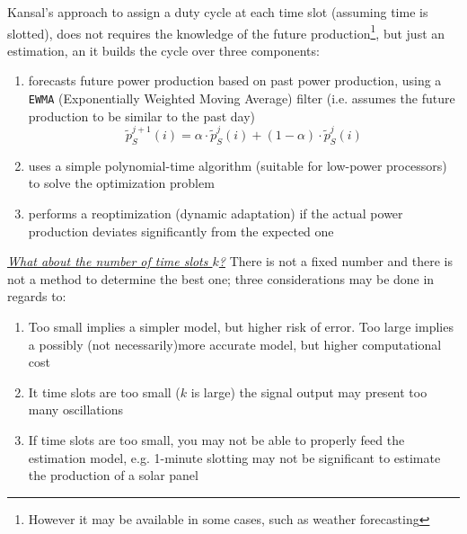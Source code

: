 Kansal's approach to assign a duty cycle at each time slot (assuming time is slotted), does not requires the knowledge of the future production\footnote{However it may be available in some cases, such as weather forecasting}, but just an estimation, an it builds the cycle over three components:
\begin{enumerate}
   \item forecasts future power production based on past power production, using a \texttt{EWMA} (Exponentially Weighted Moving Average) filter (i.e. assumes the future production to be similar to the past day)
   \begin{equation}
      \tilde{p}^{j+1}_S(i) = \alpha \cdot\tilde{p}^j_S(i) + (1-\alpha)\cdot\tilde{p}^j_S(i)
   \end{equation}
   \item uses a simple polynomial-time algorithm (suitable for low-power processors) to solve the
   optimization problem
   \item performs a reoptimization (dynamic adaptation) if the actual power production deviates
   significantly from the expected one
\end{enumerate}



\textit{\ul{What about the number of time slots $k$?}} There is not a fixed number and there is not a method to determine the best one; three considerations may be done in regards to:

\begin{enumerate}
   \item Too small implies a simpler model, but higher risk of error. Too large implies a possibly (not necessarily)more accurate model, but higher computational cost
   \item It time slots are too small ($k$ is large) the signal output may present too many oscillations
   \item If time slots are too small, you may not be able to properly feed the estimation model, e.g. 1-minute slotting may not be significant to estimate the production of a solar panel
\end{enumerate}
